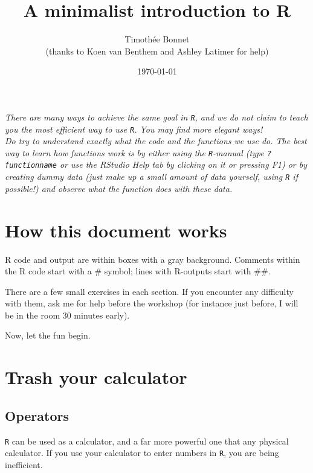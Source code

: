 \documentclass[12pt,a4paper]{scrartcl}\usepackage[]{graphicx}\usepackage[]{color}
\title{A minimalist introduction to R}
\date{\today}
\author{Timothée Bonnet\\ (thanks to Koen van Benthem and Ashley Latimer for help)}
\begin{document}
\maketitle

\tableofcontents



\vspace{2cm}
\begin{mdframed}
\textit{There are many ways to achieve the same goal in \texttt{R}, and we do not claim to teach you the most efficient way to use \texttt{R}. You may find more elegant ways! \\[1.5ex] 
Do try to understand exactly what the code and the functions we use do. The best way to learn how functions work is by either using the \texttt{R}-manual (type \texttt{?functionname} or use the RStudio Help tab by clicking on it or pressing F1) or by creating dummy data (just make up a small amount of data yourself, using \texttt{R} if possible!) and observe what the function does with these data.}
\end{mdframed}
\newpage

\section*{How this document works}
R code and output are within boxes with a gray background. Comments within the R code start with a \# symbol; lines with R-outputs start with \#\#.

There are a few small exercises in each section. If you encounter any difficulty with them, ask me for help before the workshop (for instance just before, I will be in the room 30 minutes early).

Now, let the fun begin.

\section{Trash your calculator}
\subsection{Operators}
\texttt{R} can be used as a calculator, and a far more powerful one that any physical calculator. If you use your calculator to enter numbers in \texttt{R}, you are being inefficient.
\end{document}
